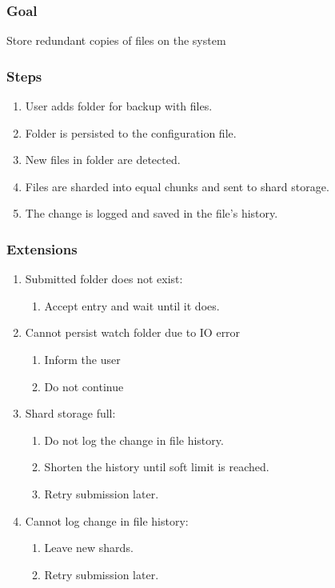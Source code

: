 \documentclass[11pt, a4paper, twoside]{report}
\begin{document}
\subsubsection{Goal}

Store redundant copies of files on the system

\subsubsection{Steps}

\begin{enumerate}
 \item User adds folder for backup with files.
 \item Folder is persisted to the configuration file.
 \item New files in folder are detected.
 \item Files are sharded into equal chunks and sent to shard storage.
 \item The change is logged and saved in the file's history.
\end{enumerate}

\subsubsection{Extensions}
\begin{enumerate}
  \item Submitted folder does not exist:
	\begin{enumerate}
	  \item Accept entry and wait until it does.
	\end{enumerate}
  \item Cannot persist watch folder due to IO error
	\begin{enumerate}
	  \item Inform the user
	  \item Do not continue
	\end{enumerate}
  \item Shard storage full:
	\begin{enumerate}
	  \item Do not log the change in file history.
	  \item Shorten the history until soft limit is reached.
	  \item Retry submission later.
	\end{enumerate}
  \item Cannot log change in file history:
	\begin{enumerate}
	  \item Leave new shards.
	  \item Retry submission later.
	\end{enumerate}
\end{enumerate}
\end{document}
